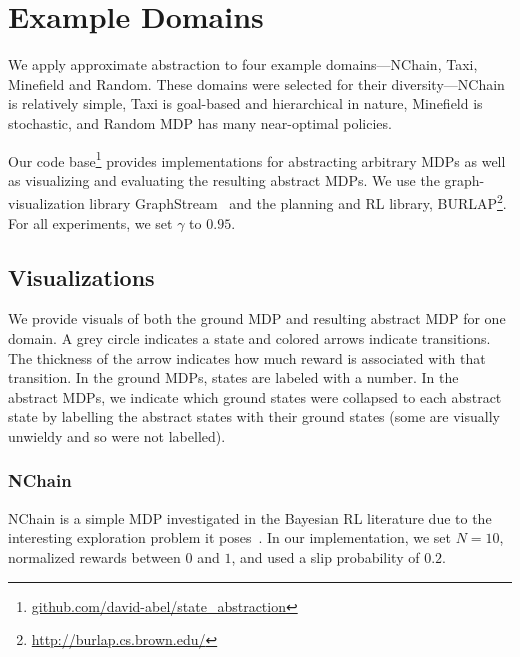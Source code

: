 \section{Example Domains}
We apply approximate abstraction to four example domains---NChain, Taxi, Minefield and Random. These domains were selected for their diversity---NChain is relatively simple, Taxi is goal-based and hierarchical in nature, Minefield is stochastic, and Random MDP has many near-optimal policies.

Our code base\footnote{\url{github.com/david-abel/state_abstraction}} provides implementations for abstracting arbitrary \acp{MDP} as well as visualizing and evaluating the resulting abstract \acp{MDP}. We use the graph-visualization library GraphStream~\cite{graphstream} and the planning and \ac{RL} library, BURLAP\footnote{\url{http://burlap.cs.brown.edu/}}. For all experiments, we set $\gamma$ to $0.95$.

\subsection{Visualizations}

We provide visuals of both the ground \ac{MDP} and resulting abstract \ac{MDP} for one domain. A grey circle indicates a state and colored arrows indicate transitions. The thickness of the arrow indicates how much reward is associated with that transition. In the ground \acp{MDP}, states are labeled with a number. In the abstract \acp{MDP}, we indicate which ground states were collapsed to each abstract state by labelling the abstract states with their ground states (some are visually unwieldy and so were not labelled).

\subsubsection{NChain}

NChain is a simple \ac{MDP} investigated in the Bayesian \ac{RL} literature due to the interesting exploration problem it poses~\cite{dearden1998bayesian}. In our implementation, we set $N=10$, normalized rewards between $0$ and $1$, and used a slip probability of $0.2$.

